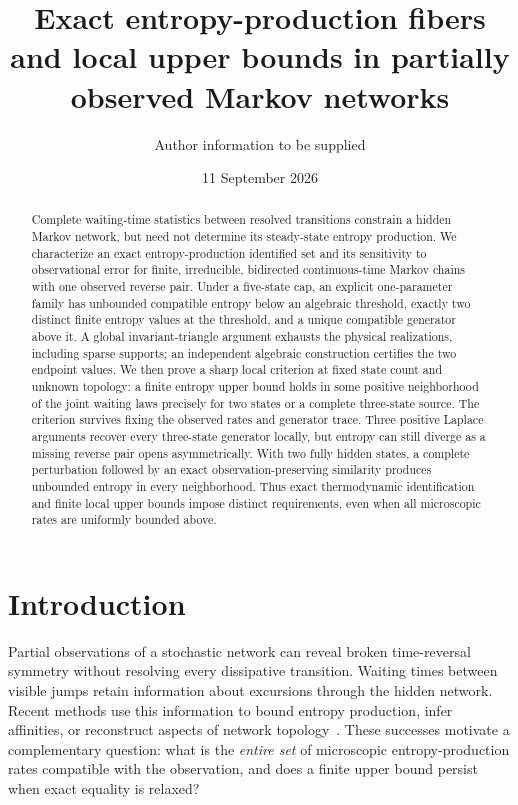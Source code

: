 \documentclass[aps,pre,onecolumn,11pt,longbibliography,notitlepage]{revtex4-2}
\newcommand{\1}{\mathbf 1}
\begin{document}
\title{Exact entropy-production fibers and local upper bounds in partially observed Markov networks}
\author{Author information to be supplied}
\noaffiliation
\date{11 September 2026}
\begin{abstract}
Complete waiting-time statistics between resolved transitions constrain a hidden Markov network, but need not determine its steady-state entropy production. We characterize an exact entropy-production identified set and its sensitivity to observational error for finite, irreducible, bidirected continuous-time Markov chains with one observed reverse pair. Under a five-state cap, an explicit one-parameter family has unbounded compatible entropy below an algebraic threshold, exactly two distinct finite entropy values at the threshold, and a unique compatible generator above it. A global invariant-triangle argument exhausts the physical realizations, including sparse supports; an independent algebraic construction certifies the two endpoint values. We then prove a sharp local criterion at fixed state count and unknown topology: a finite entropy upper bound holds in some positive neighborhood of the joint waiting laws precisely for two states or a complete three-state source. The criterion survives fixing the observed rates and generator trace. Three positive Laplace arguments recover every three-state generator locally, but entropy can still diverge as a missing reverse pair opens asymmetrically. With two fully hidden states, a complete perturbation followed by an exact observation-preserving similarity produces unbounded entropy in every neighborhood. Thus exact thermodynamic identification and finite local upper bounds impose distinct requirements, even when all microscopic rates are uniformly bounded above.
\end{abstract}
\maketitle

\section{Introduction}
Partial observations of a stochastic network can reveal broken time-reversal symmetry without resolving every dissipative transition. Waiting times between visible jumps retain information about excursions through the hidden network. Recent methods use this information to bound entropy production, infer affinities, or reconstruct aspects of network topology~\cite{vanDerMeer2022,Harunari2022,Maier2025}. These successes motivate a complementary question: what is the \emph{entire set} of microscopic entropy-production rates compatible with the observation, and does a finite upper bound persist when exact equality is relaxed?
\end{document}
